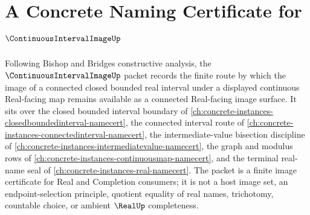 \chapter{A Concrete Naming Certificate for $\ContinuousIntervalImageUp$}
\label{ch:concrete-instances-continuous-interval-image-namecert}

Following Bishop and Bridges constructive analysis, the $\ContinuousIntervalImageUp$ packet records the finite route by which the image of a connected closed bounded real interval under a displayed continuous Real-facing map remains available as a connected Real-facing image surface. It sits over the closed bounded interval boundary of \autoref{ch:concrete-instances-closedboundedinterval-namecert}, the connected interval route of \autoref{ch:concrete-instances-connectedinterval-namecert}, the intermediate-value bisection discipline of \autoref{ch:concrete-instances-intermediatevalue-namecert}, the graph and modulus rows of \autoref{ch:concrete-instances-continuousmap-namecert}, and the terminal real-name seal of \autoref{ch:concrete-instances-real-namecert}. The packet is a finite image certificate for Real and Completion consumers; it is not a host image set, an endpoint-selection principle, quotient equality of real names, trichotomy, countable choice, or ambient $\RealUp$ completeness.

